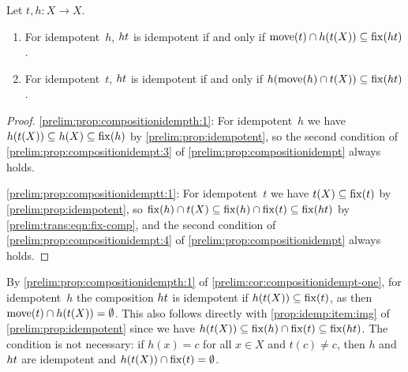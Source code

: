 \begin{corollary} \label{prelim:cor:compositionidempt-one}
	\label{prelim:prop:compositionidempth} \label{prelim:prop:compositionidemptt}
	Let $t, h \colon X \to X$.
	\begin{enumerate}
		\item \label{prelim:prop:compositionidempth:1} For idempotent~$h$,
		$\concat{t}{h}$ is idempotent if and only if
		$\move{t} \cap h(t(X)) \subseteq \fix{\concat{t}{h}}$.
		
		\item \label{prelim:prop:compositionidemptt:1} For idempotent~$t$,
		$\concat{t}{h}$ is idempotent if and only if
		$h(\move{h} \cap t(X)) \subseteq \fix{\concat{t}{h}}$.
	\end{enumerate}
\end{corollary}
\begin{proof}
	\ref{prelim:prop:compositionidempth:1}: For idempotent~$h$ we have
	$h(t(X)) \subseteq h(X) \subseteq \fix{h}$ by \cref{prelim:prop:idempotent},
	so the second condition of \cref{prelim:prop:compositionidempt:3} of
	\cref{prelim:prop:compositionidempt} always holds.
	
	\ref{prelim:prop:compositionidemptt:1}: For idempotent~$t$ we have
	$t(X) \subseteq \fix{t}$ by \cref{prelim:prop:idempotent}, so
	$\fix{h} \cap t(X) \subseteq \fix{h} \cap \fix{t} \subseteq \fix{\concat{t}{h}}$
	by \cref{prelim:trans:eqn:fix-comp}, and the second condition of
	\cref{prelim:prop:compositionidempt:4} of
	\cref{prelim:prop:compositionidempt} always holds.
\end{proof}

\begin{remark}
	By \cref{prelim:prop:compositionidempth:1} of
	\cref{prelim:cor:compositionidempt-one}, for idempotent~$h$ the composition
	$\concat{t}{h}$ is idempotent if $h(t(X)) \subseteq \fix{t}$, as then
	$\move{t} \cap h(t(X)) = \emptyset$.
	This also follows directly with \cref{prop:idemp:item:img} of \cref{prelim:prop:idempotent}
	since we have $h(t(X)) \subseteq \fix{h} \cap \fix{t} \subseteq \fix{\concat{t}{h}}$.
	The condition is not necessary: if $h(x) = c$ for all $x \in X$ and
	$t(c) \ne c$, then $h$ and $\concat{t}{h}$ are idempotent and
	$h(t(X)) \cap \fix{t} = \emptyset$.
\end{remark}


